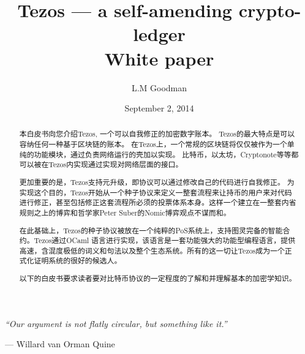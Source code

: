 \documentclass[letterpaper]{article}
\author{L.M Goodman}
\date{September 2, 2014}
\title{Tezos --- a self-amending crypto-ledger \\ White paper}
\begin{document}
\maketitle

\epigraph{\emph{``Our argument is not flatly circular,
but something like it.''}}
{--- \textup{Willard van Orman Quine}}


\begin{abstract}
本白皮书向您介绍Tezos, 一个可以自我修正的加密数字账本。
Tezos的最大特点是可以容纳任何一种基于区块链的账本。 
在Tezos上，一个常规的区块链将仅仅被作为一个单纯的功能模块，通过负责网络运行的壳加以实现。
比特币，以太坊，Cryptonote等等都可以被在Tezos内实现通过实现对网络层面的接口。


更加重要的是，Tezos支持元升级，即协议可以通过修改自己的代码进行自我修正。
为实现这个目的，Tezos开始从一个种子协议来定义一整套流程来让持币的用户来对代码进行修正，甚至包括修正这套流程所必须的投票体系本身。这样一个建立在一整套内省规则之上的博弈和哲学家Peter Suber的Nomic博弈观点不谋而和。

在此基础上，Tezos的种子协议被放在一个纯粹的PoS系统上，支持图灵完备的智能合约。Tezos通过OCaml 语言进行实现，该语言是一套功能强大的功能型编程语言，提供高速，含混度极低的词义和句法以及整个生态系统。所有的这一切让Tezos成为一个正式化证明系统的很好的候选人。

以下的白皮书要求读者要对比特币协议的一定程度的了解和并理解基本的加密学知识。

\end{abstract}
\newpage
\end{document}

